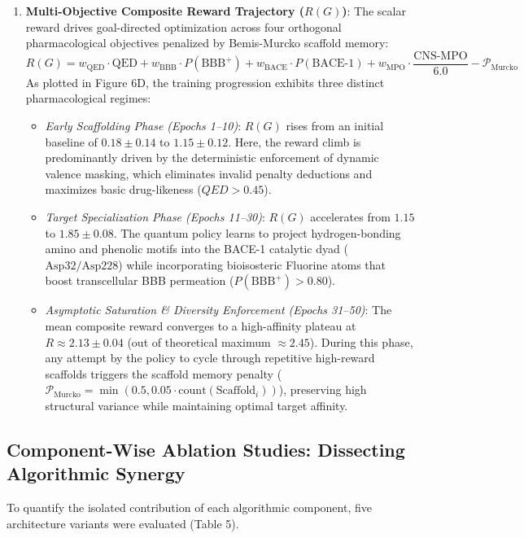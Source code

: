 \documentclass[10pt,a4paper]{article}
\begin{document}
\begin{enumerate}[leftmargin=*]
    \item \textbf{Multi-Objective Composite Reward Trajectory ($R(G)$)}:
    The scalar reward drives goal-directed optimization across four orthogonal pharmacological objectives penalized by Bemis-Murcko scaffold memory:
    \begin{equation}
    R(G) = w_{\text{QED}} \cdot \text{QED} + w_{\text{BBB}} \cdot P(\text{BBB}^+) + w_{\text{BACE}} \cdot P(\text{BACE-1}) + w_{\text{MPO}} \cdot \frac{\text{CNS-MPO}}{6.0} - \mathcal{P}_{\text{Murcko}}
    \end{equation}
    As plotted in Figure 6D, the training progression exhibits three distinct pharmacological regimes:
    \begin{itemize}[noitemsep]
        \item \textit{Early Scaffolding Phase (Epochs 1--10)}: $R(G)$ rises from an initial baseline of $0.18 \pm 0.14$ to $1.15 \pm 0.12$. Here, the reward climb is predominantly driven by the deterministic enforcement of dynamic valence masking, which eliminates invalid penalty deductions and maximizes basic drug-likeness ($QED > 0.45$).
        \item \textit{Target Specialization Phase (Epochs 11--30)}: $R(G)$ accelerates from $1.15$ to $1.85 \pm 0.08$. The quantum policy learns to project hydrogen-bonding amino and phenolic motifs into the BACE-1 catalytic dyad ($\text{Asp}32/\text{Asp}228$) while incorporating bioisosteric Fluorine atoms that boost transcellular BBB permeation ($P(\text{BBB}^+) > 0.80$).
        \item \textit{Asymptotic Saturation \& Diversity Enforcement (Epochs 31--50)}: The mean composite reward converges to a high-affinity plateau at $R \approx 2.13 \pm 0.04$ (out of theoretical maximum $\approx 2.45$). During this phase, any attempt by the policy to cycle through repetitive high-reward scaffolds triggers the scaffold memory penalty ($\mathcal{P}_{\text{Murcko}} = \min(0.5, 0.05 \cdot \text{count}(\text{Scaffold}_i))$), preserving high structural variance while maintaining optimal target affinity.
    \end{itemize}
\end{enumerate}

\subsection{Component-Wise Ablation Studies: Dissecting Algorithmic Synergy}
To quantify the isolated contribution of each algorithmic component, five architecture variants were evaluated (Table 5).
\end{document}
